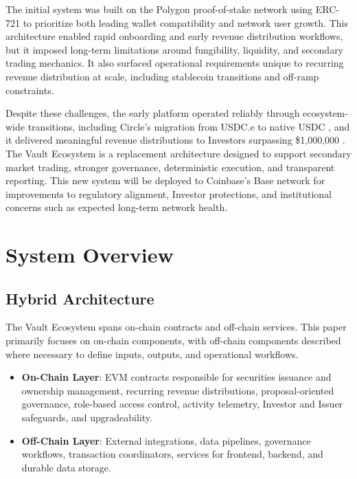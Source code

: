 \documentclass[10pt]{article}
\begin{document}
The initial system was built on the Polygon proof-of-stake network using ERC-721 \cite{ethereum_erc721} to prioritize
both leading wallet compatibility and network user growth. This architecture enabled rapid onboarding
and early revenue distribution workflows, but it imposed long-term limitations around fungibility,
liquidity, and secondary trading mechanics. It also surfaced operational requirements unique to
recurring revenue distribution at scale, including stablecoin transitions and off-ramp constraints.

Despite these challenges, the early platform operated reliably through ecosystem-wide transitions,
including Circle's migration from USDC.e to native USDC \cite{circle_usdc}, and it delivered meaningful revenue distributions
to Investors surpassing \$1,000,000 \cite{gigastar_milestone_2025}. The Vault Ecosystem is a replacement architecture designed
to support secondary market trading, stronger governance, deterministic execution, and transparent
reporting. This new system will be deployed to Coinbase's \cite{coinbase_about} Base network \cite{base_network} for improvements to
regulatory alignment, Investor protections, and institutional concerns such as expected long-term network health.

\section{System Overview}

\subsection{Hybrid Architecture}
The Vault Ecosystem spans on-chain contracts and off-chain services. This
paper primarily focuses on on-chain components, with off-chain components
described where necessary to define inputs, outputs, and operational
workflows.

\begin{itemize}
    \item \textbf{On-Chain Layer}: EVM contracts responsible for securities
          issuance and ownership management, recurring revenue distributions,
          proposal-oriented governance, role-based access control, activity
          telemetry, Investor and Issuer safeguards, and upgradeability.

    \item \textbf{Off-Chain Layer}: External integrations, data pipelines,
          governance workflows, transaction coordinators, services for frontend,
          backend, and durable data storage.
\end{itemize}
\end{document}
